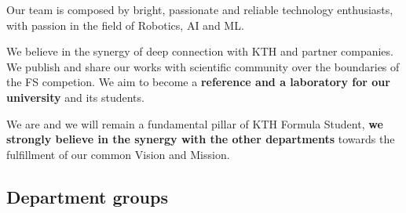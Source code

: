 \documentclass[graybox]{svmult}
\begin{document}
Our team is composed by bright, passionate and reliable technology enthusiasts, with passion in the field of Robotics, AI and ML.

We believe in the synergy of deep connection with KTH and partner companies. We publish and share our works with scientific community over the boundaries of the FS competion. We aim to become a \textbf{reference and a laboratory for our university} and its students.

We are and we will remain a fundamental pillar of KTH Formula Student, \textbf{we strongly believe in the synergy with the other departments} towards the fulfillment of our common Vision and Mission. 

\subsection{Department groups}
\end{document}

